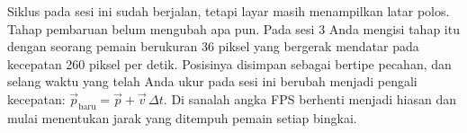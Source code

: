 
Siklus pada sesi ini sudah berjalan, tetapi layar masih menampilkan latar
polos. Tahap pembaruan belum mengubah apa pun. Pada sesi 3 Anda mengisi tahap
itu dengan seorang pemain berukuran 36 piksel yang bergerak mendatar pada
kecepatan 260 piksel per detik. Posisinya disimpan sebagai 
bertipe pecahan, dan selang waktu yang telah Anda ukur pada sesi ini berubah
menjadi pengali kecepatan: $\vec{p}_{\text{baru}} = \vec{p} + \vec{v}\,\Delta
t$. Di sanalah angka FPS berhenti menjadi hiasan dan mulai menentukan jarak
yang ditempuh pemain setiap bingkai.
